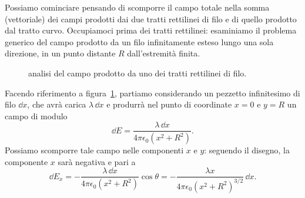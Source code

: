 \documentclass[10pt]{gulartcl}
\begin{document}
\begin{solution}
Possiamo cominciare pensando di scomporre il campo totale nella somma
(vettoriale) dei campi prodotti dai due tratti rettilinei di filo e di
quello prodotto dal tratto curvo. Occupiamoci prima dei tratti rettilinei:
esaminiamo il problema generico del campo prodotto da un filo infinitamente
esteso lungo una sola direzione, in un punto distante $R$ dall’estremità
finita.

\begin{figure}
\centering
{}
\caption{analisi del campo prodotto da uno dei tratti rettilinei di filo.}
\label{fig:thread-field}
\end{figure}


Facendo riferimento a figura~\ref{fig:thread-field}, partiamo considerando
un pezzetto infinitesimo di filo $\dd x$, che avrà carica $\lambda\,\dd x$
e produrrà nel punto di coordinate $x = 0$ e $y = R$ un campo di modulo
\begin{equation}
    \dd E = \frac{\lambda\, \dd x}{4 \pi \epsilon_0 (x^2 + R^2)}.
    \label{eq:thread-field-dd}
\end{equation}
Possiamo scomporre tale campo nelle componenti $x$ e $y$: seguendo il
disegno, la componente $x$ sarà negativa e pari a
\begin{equation}
    \dd E_x = - \frac{\lambda\, \dd x}{4 \pi \epsilon_0 (x^2 + R^2)}
    \cos\theta = - \frac{\lambda x}{4 \pi \epsilon_0 (x^{2} +
    R^{2})^{3/2}} \, \dd x.
\end{equation}


\end{solution}
\end{document}
